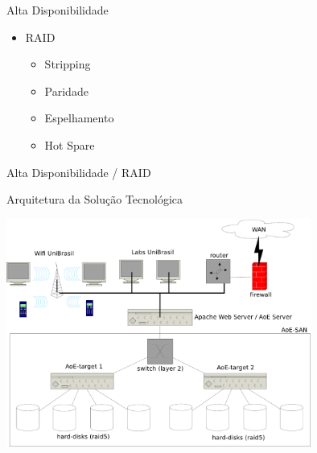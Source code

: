 \documentclass{beamer}
\begin{document}
\begin{frame}{Alta Disponibilidade}
\begin{itemize}
	\item RAID
		\begin{itemize}
		\item Stripping
		\item Paridade
		\item Espelhamento
		\item Hot Spare
		\end{itemize}
\end{itemize}
\end{frame}


\begin{frame}{Alta Disponibilidade / RAID}
\begin{figure}[ht]
\end{figure}
\end{frame}


\begin{frame}{Arquitetura da Solução Tecnológica}
\begin{center}
\includegraphics[width=10cm]{./img/arquitetura-solucao}
\end{center}
\end{frame}
\end{document}
